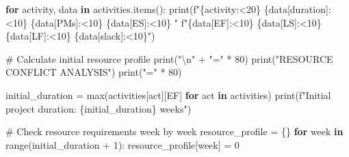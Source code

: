 \documentclass[
  letterpaper,
  DIV=11,
  numbers=noendperiod]{scrreprt}
\newenvironment{Shaded}{\begin{snugshade}}{\end{snugshade}}
\newcommand{\BuiltInTok}[1]{\textcolor[rgb]{0.00,0.23,0.31}{#1}}
\newcommand{\CharTok}[1]{\textcolor[rgb]{0.13,0.47,0.30}{#1}}
\newcommand{\CommentTok}[1]{\textcolor[rgb]{0.37,0.37,0.37}{#1}}
\newcommand{\ControlFlowTok}[1]{\textcolor[rgb]{0.00,0.23,0.31}{\textbf{#1}}}
\newcommand{\DecValTok}[1]{\textcolor[rgb]{0.68,0.00,0.00}{#1}}
\newcommand{\KeywordTok}[1]{\textcolor[rgb]{0.00,0.23,0.31}{\textbf{#1}}}
\newcommand{\NormalTok}[1]{\textcolor[rgb]{0.00,0.23,0.31}{#1}}
\newcommand{\OperatorTok}[1]{\textcolor[rgb]{0.37,0.37,0.37}{#1}}
\newcommand{\SpecialCharTok}[1]{\textcolor[rgb]{0.37,0.37,0.37}{#1}}
\newcommand{\SpecialStringTok}[1]{\textcolor[rgb]{0.13,0.47,0.30}{#1}}
\newcommand{\StringTok}[1]{\textcolor[rgb]{0.13,0.47,0.30}{#1}}
\begin{document}
\begin{Shaded}
\begin{Highlighting}[]
    \ControlFlowTok{for}\NormalTok{ activity, data }\KeywordTok{in}\NormalTok{ activities.items():}
        \BuiltInTok{print}\NormalTok{(}\SpecialStringTok{f"}\SpecialCharTok{\{}\NormalTok{activity}\SpecialCharTok{:\textless{}20\}}\SpecialStringTok{ }\SpecialCharTok{\{}\NormalTok{data[}\StringTok{\textquotesingle{}duration\textquotesingle{}}\NormalTok{]}\SpecialCharTok{:\textless{}10\}}\SpecialStringTok{ }\SpecialCharTok{\{}\NormalTok{data[}\StringTok{\textquotesingle{}PMs\textquotesingle{}}\NormalTok{]}\SpecialCharTok{:\textless{}10\}}\SpecialStringTok{ }\SpecialCharTok{\{}\NormalTok{data[}\StringTok{\textquotesingle{}ES\textquotesingle{}}\NormalTok{]}\SpecialCharTok{:\textless{}10\}}\SpecialStringTok{ "}
              \SpecialStringTok{f"}\SpecialCharTok{\{}\NormalTok{data[}\StringTok{\textquotesingle{}EF\textquotesingle{}}\NormalTok{]}\SpecialCharTok{:\textless{}10\}}\SpecialStringTok{ }\SpecialCharTok{\{}\NormalTok{data[}\StringTok{\textquotesingle{}LS\textquotesingle{}}\NormalTok{]}\SpecialCharTok{:\textless{}10\}}\SpecialStringTok{ }\SpecialCharTok{\{}\NormalTok{data[}\StringTok{\textquotesingle{}LF\textquotesingle{}}\NormalTok{]}\SpecialCharTok{:\textless{}10\}}\SpecialStringTok{ }\SpecialCharTok{\{}\NormalTok{data[}\StringTok{\textquotesingle{}slack\textquotesingle{}}\NormalTok{]}\SpecialCharTok{:\textless{}10\}}\SpecialStringTok{"}\NormalTok{)}
    
    \CommentTok{\# Calculate initial resource profile}
    \BuiltInTok{print}\NormalTok{(}\StringTok{"}\CharTok{\textbackslash{}n}\StringTok{"} \OperatorTok{+} \StringTok{"="} \OperatorTok{*} \DecValTok{80}\NormalTok{)}
    \BuiltInTok{print}\NormalTok{(}\StringTok{"RESOURCE CONFLICT ANALYSIS"}\NormalTok{)}
    \BuiltInTok{print}\NormalTok{(}\StringTok{"="} \OperatorTok{*} \DecValTok{80}\NormalTok{)}
    
\NormalTok{    initial\_duration }\OperatorTok{=} \BuiltInTok{max}\NormalTok{(activities[act][}\StringTok{\textquotesingle{}EF\textquotesingle{}}\NormalTok{] }\ControlFlowTok{for}\NormalTok{ act }\KeywordTok{in}\NormalTok{ activities)}
    \BuiltInTok{print}\NormalTok{(}\SpecialStringTok{f"Initial project duration: }\SpecialCharTok{\{}\NormalTok{initial\_duration}\SpecialCharTok{\}}\SpecialStringTok{ weeks"}\NormalTok{)}
    
    \CommentTok{\# Check resource requirements week by week}
\NormalTok{    resource\_profile }\OperatorTok{=}\NormalTok{ \{\}}
    \ControlFlowTok{for}\NormalTok{ week }\KeywordTok{in} \BuiltInTok{range}\NormalTok{(initial\_duration }\OperatorTok{+} \DecValTok{1}\NormalTok{):}
\NormalTok{        resource\_profile[week] }\OperatorTok{=} \DecValTok{0}
    

\end{Highlighting}
\end{Shaded}
\end{document}
